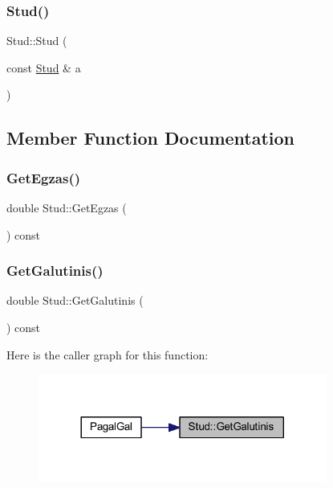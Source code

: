\subsubsection{\texorpdfstring{Stud()}{Stud()}\hspace{0.1cm}{\footnotesize\ttfamily [4/4]}}
{\footnotesize\ttfamily Stud\+::\+Stud (\begin{DoxyParamCaption}\item[{const \mbox{\hyperlink{class_stud}{Stud}} \&}]{a }\end{DoxyParamCaption})}



\subsection{Member Function Documentation}
\mbox{\label{class_stud_a79cce5ddc342ad67ff5ce46254faa408}} 
\subsubsection{\texorpdfstring{GetEgzas()}{GetEgzas()}}
{\footnotesize\ttfamily double Stud\+::\+Get\+Egzas (\begin{DoxyParamCaption}{ }\end{DoxyParamCaption}) const}

\mbox{\label{class_stud_ae6e584f68200c6c325e40b0a74b8cf40}} 
\subsubsection{\texorpdfstring{GetGalutinis()}{GetGalutinis()}}
{\footnotesize\ttfamily double Stud\+::\+Get\+Galutinis (\begin{DoxyParamCaption}{ }\end{DoxyParamCaption}) const}

Here is the caller graph for this function\+:
\nopagebreak
\begin{figure}[H]
\begin{center}
\leavevmode
\includegraphics[width=269pt]{class_stud_ae6e584f68200c6c325e40b0a74b8cf40_icgraph}
\end{center}
\end{figure}
\mbox{\label{class_stud_ad500475ff8e68c9d52db885bdf16937b}} 
